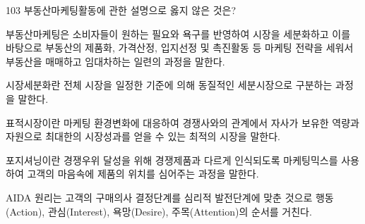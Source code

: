 \begin{question}{103}
부동산마케팅활동에 관한 설명으로 옳지 않은 것은?
\begin{choices}
  \item 부동산마케팅은 소비자들이 원하는 필요와 욕구를 반영하여 시장을 세분화하고 이를 바탕으로 부동산의 제품화, 가격산정, 입지선정 및 촉진활동 등 마케팅 전략을 세워서 부동산을 매매하고 임대차하는 일련의 과정을 말한다.
  \item 시장세분화란 전체 시장을 일정한 기준에 의해 동질적인 세분시장으로 구분하는 과정을 말한다.
  \item 표적시장이란 마케팅 환경변화에 대응하여 경쟁사와의 관계에서 자사가 보유한 역량과 자원으로 최대한의 시장성과를 얻을 수 있는 최적의 시장을 말한다.
  \item 포지셔닝이란 경쟁우위 달성을 위해 경쟁제품과 다르게 인식되도록 마케팅믹스를 사용하여 고객의 마음속에 제품의 위치를 심어주는 과정을 말한다.
  \item AIDA 원리는 고객의 구매의사 결정단계를 심리적 발전단계에 맞춘 것으로 행동(Action), 관심(Interest), 욕망(Desire), 주목(Attention)의 순서를 거친다.
\end{choices}
\end{question}
